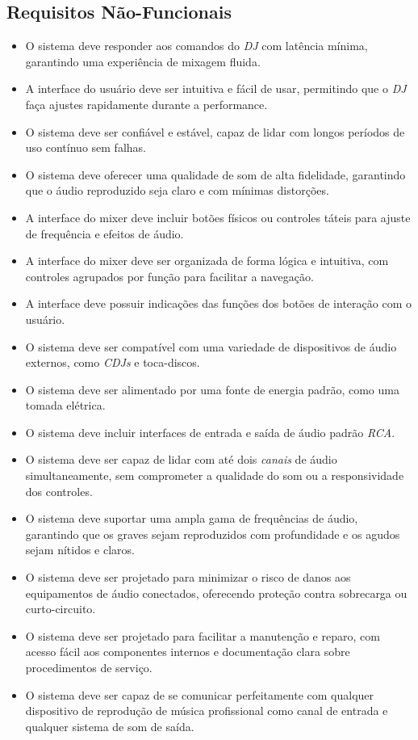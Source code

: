 \subsection{Requisitos Não-Funcionais}
\begin{itemize}
    \item O sistema deve responder aos comandos do \textit{DJ} com latência mínima, garantindo uma experiência de mixagem fluida.
    \item A interface do usuário deve ser intuitiva e fácil de usar, permitindo que o \textit{DJ} faça ajustes rapidamente durante a performance.
    \item O sistema deve ser confiável e estável, capaz de lidar com longos períodos de uso contínuo sem falhas.
    \item O sistema deve oferecer uma qualidade de som de alta fidelidade, garantindo que o áudio reproduzido seja claro e com mínimas distorções.
    \item A interface do mixer deve incluir botões físicos ou controles táteis para ajuste de frequência e efeitos de áudio.
    \item A interface do mixer deve ser organizada de forma lógica e intuitiva, com controles agrupados por função para facilitar a navegação.
    \item A interface deve possuir indicações das funções dos botões de interação com o usuário.
    \item O sistema deve ser compatível com uma variedade de dispositivos de áudio externos, como \textit{CDJs} e toca-discos.
    \item O sistema deve ser alimentado por uma fonte de energia padrão, como uma tomada elétrica.
    \item O sistema deve incluir interfaces de entrada e saída de áudio padrão \textit{RCA}.
    \item O sistema deve ser capaz de lidar com até dois \textit{canais} de áudio simultaneamente, sem comprometer a qualidade do som ou a responsividade dos controles.
    \item O sistema deve suportar uma ampla gama de frequências de áudio, garantindo que os graves sejam reproduzidos com profundidade e os agudos sejam nítidos e claros.
    \item O sistema deve ser projetado para minimizar o risco de danos aos equipamentos de áudio conectados, oferecendo proteção contra sobrecarga ou curto-circuito.
    \item O sistema deve ser projetado para facilitar a manutenção e reparo, com acesso fácil aos componentes internos e documentação clara sobre procedimentos de serviço.
    \item O sistema deve ser capaz de se comunicar perfeitamente com qualquer dispositivo de reprodução de música profissional como canal de entrada e qualquer sistema de som de saída. 
\end{itemize}


